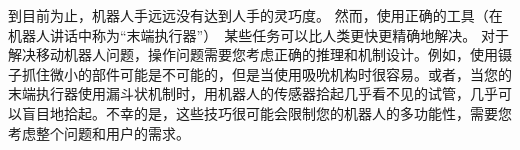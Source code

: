 到目前为止，机器人手远远没有达到人手的灵巧度。 然而，使用正确的工具（在机器人讲话中称为“末端执行器”）~某些任务可以比人类更快更精确地解决。 对于解决移动机器人问题，操作问题需要您考虑正确的推理和机制设计。例如，使用镊子抓住微小的部件可能是不可能的，但是当使用吸吮机构时很容易。或者，当您的末端执行器使用漏斗状机制时，用机器人的传感器拾起几乎看不见的试管，几乎可以盲目地拾起。不幸的是，这些技巧很可能会限制您的机器人的多功能性，需要您考虑整个问题和用户的需求。




